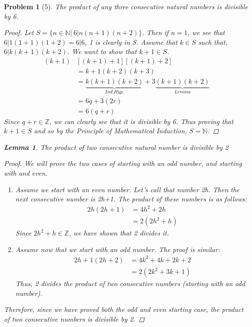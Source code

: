 \documentclass{article}
\theoremstyle{problem}
\newtheorem{prob}{Problem}
\theoremstyle{plain}
\newtheorem{lem}{Lemma}
\begin{document}
  \begin{prob}[5]
    The product of any three consecutive natural numbers is divisible by 6.
    \begin{multicols}{2}
    \begin{proof}
      Let $S = \{n \in \mathbb{N} |\ 6 | n(n+1)(n+2)\}$. Then if $n = 1$, we see that $6|1(1+1)(1+2) = 6|6$, 1 is clearly in S. Assume that $k \in S$ such that, $6|k(k+1)(k+2)$. We want to show that $k+1 \in S$.
      \begin{align*}
        (k+1)&[(k+1)+1][(k+1)+2] \\
        &= k+1(k+2)(k+3)\\
        &= \underbrace{k(k+1)(k+2)}_{Ind. Hyp.} + 3\underbrace{(k+1)(k+2)}_{Lemma}\\
        &= 6q + 3(2r)\\
        &= 6(q + r)        
      \end{align*}
      Since $q + r \in \mathbb{Z}$, we can clearly see that it is divisible by 6. Thus proving that $k + 1 \in S$ and so by the Principle of Mathematical Induction, $S=\mathbb{N}$.
    \end{proof}
    \vfill
    \columnbreak
    \begin{lem}
      The product of two consecutive natural number is divisible by 2
      \begin{proof}
        We will prove the two cases of starting with an odd number, and starting with and even.
        \begin{enumerate}[{Case} 1)]
        \item Assume we start with an even number. Let's call that number 2h. Then the next consecutive number is 2h+1. The product of these numbers is as follows:
          \begin{align*}
            2h(2h+1) &= 4h^2 + 2h\\
            &= 2(2h^2 + h)
          \end{align*}
          Since $2h^2 + h \in \mathbb{Z}$, we have shown that 2 divides it.
        \item Assume now that we start with an odd number. The proof is similar:
          \begin{align*}
            2h+1(2h+2) &= 4k^2 + 4k + 2k +2\\
            &= 2(2k^2 + 3k + 1)
          \end{align*} 
          Thus, 2 divides the product of two consecutive numbers (starting with an odd number).
        \end{enumerate}
        Therefore, since we have proved both the odd and even starting case, the product of two consecutive numbers is divisible by 2.
      \end{proof}      
    \end{lem}
  \end{multicols}
  \end{prob}
\end{document}
